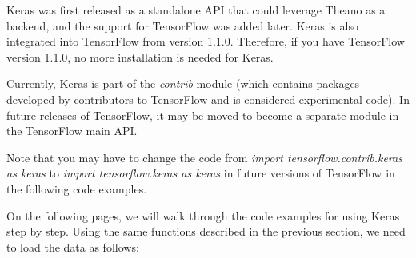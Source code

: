 \documentclass[11pt]{article}
\begin{document}
Keras was first released as a standalone API that could leverage Theano
as a backend, and the support for TensorFlow was added later. Keras is
also integrated into TensorFlow from version 1.1.0. Therefore, if you
have TensorFlow version 1.1.0, no more installation is needed for Keras.

Currently, Keras is part of the \emph{contrib} module (which contains
packages developed by contributors to TensorFlow and is considered
experimental code). In future releases of TensorFlow, it may be moved to
become a separate module in the TensorFlow main API.

Note that you may have to change the code from \emph{import
tensorflow.contrib.keras as keras} to \emph{import tensorflow.keras as
keras} in future versions of TensorFlow in the following code examples.

On the following pages, we will walk through the code examples for using
Keras step by step. Using the same functions described in the previous
section, we need to load the data as follows:
\end{document}
